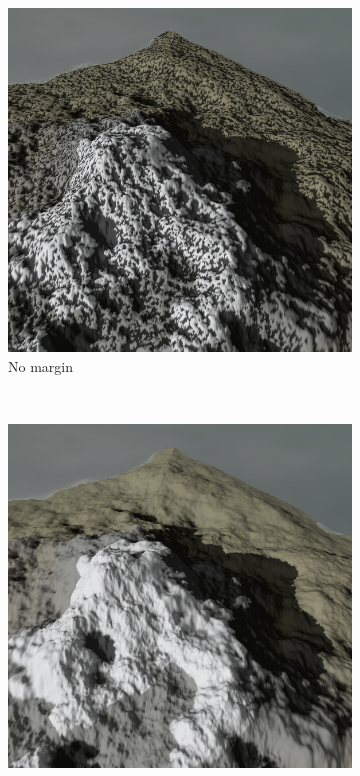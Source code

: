 \documentclass{article}
\begin{document}
\begin{figure}[H]
\centering
    \begin{subfigure}[b]{0.45\textwidth}
        \centering
        \includegraphics[scale=0.25]{shadowMargin0}
        \caption{No margin}
        \label{fig:shadowMargin0}
    \end{subfigure}
    ~
    \begin{subfigure}[b]{0.45\textwidth}
        \centering
        \includegraphics[scale=0.25]{shadowMargin1}

\end{subfigure}
\end{figure}
\end{document}
